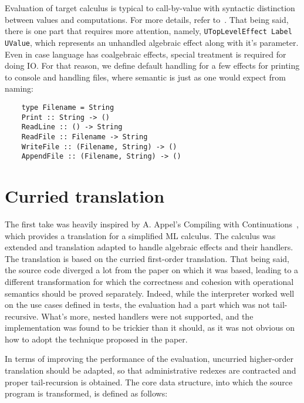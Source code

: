 \documentclass[declaration,shortabstract]{iithesis}
\theoremstyle{definition} \newtheorem{definition}{Definition}[chapter]
\theoremstyle{remark} \newtheorem{remark}[definition]{Observation}
\theoremstyle{plain} \newtheorem{theorem}[definition]{Theorem}
\theoremstyle{plain} \newtheorem{lemma}[definition]{Lemma}
\begin{document}
    \noindent
    Evaluation of target calculus is typical to call-by-value with syntactic
    distinction between values and computations. For more details, refer
    to~\cite{handlers-cps-journal}. That being said, there is one part
    that requires more attention, namely, \verb!UTopLevelEffect Label UValue!,
    which represents an unhandled algebraic effect along with it's parameter.
    Even in case language has coalgebraic effects, special treatment is required
    for doing IO\@. For that reason, we define default handling for a few effects
    for printing to console and handling files, where semantic is just as one
    would expect from naming:

\begin{verbatim}
    type Filename = String
    Print :: String -> ()
    ReadLine :: () -> String
    ReadFile :: Filename -> String
    WriteFile :: (Filename, String) -> ()
    AppendFile :: (Filename, String) -> ()
\end{verbatim}

    \section{Curried translation}

    The first take was heavily inspired by A. Appel's Compiling with
    Continuations~\cite{appel-continuations}, which provides a translation for
    a simplified ML calculus. The calculus was extended and translation adapted to
    handle algebraic effects and their handlers. The translation is based on the curried
    first-order translation. That being said, the source code diverged a lot from the
    paper on which it was based, leading to a different transformation for which the
    correctness and cohesion with operational semantics should be proved separately.
    Indeed, while the interpreter worked well on the use cases defined in tests, the
    evaluation had a part which was not tail-recursive. What's more, nested handlers
    were not supported, and the implementation was found to be trickier than it should,
    as it was not obvious on how to adopt the technique proposed in the paper.

    In terms of improving the performance of the evaluation, uncurried higher-order
    translation should be adapted, so that administrative redexes are contracted
    and proper tail-recursion is obtained. The core data structure, into which the
    source program is transformed, is defined as follows:
\end{document}
